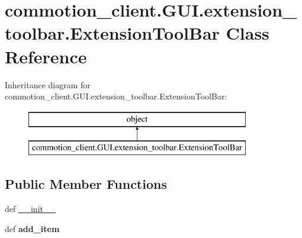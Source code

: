 \hypertarget{classcommotion__client_1_1GUI_1_1extension__toolbar_1_1ExtensionToolBar}{\section{commotion\-\_\-client.\-G\-U\-I.\-extension\-\_\-toolbar.\-Extension\-Tool\-Bar Class Reference}
\label{classcommotion__client_1_1GUI_1_1extension__toolbar_1_1ExtensionToolBar}
}
Inheritance diagram for commotion\-\_\-client.\-G\-U\-I.\-extension\-\_\-toolbar.\-Extension\-Tool\-Bar\-:\begin{figure}[H]
\begin{center}
\leavevmode
\includegraphics[height=2.000000cm]{classcommotion__client_1_1GUI_1_1extension__toolbar_1_1ExtensionToolBar}
\end{center}
\end{figure}
\subsection*{Public Member Functions}
\begin{DoxyCompactItemize}
\item 
def \hyperlink{classcommotion__client_1_1GUI_1_1extension__toolbar_1_1ExtensionToolBar_a29e92f0e66f5f056be55e3a5ef7f2fd8}{\-\_\-\-\_\-init\-\_\-\-\_\-}
\item 
\hypertarget{classcommotion__client_1_1GUI_1_1extension__toolbar_1_1ExtensionToolBar_a82e5c75a5e699eb6dd86810dab2b43a8}{def {\bfseries add\-\_\-item}}\label{classcommotion__client_1_1GUI_1_1extension__toolbar_1_1ExtensionToolBar_a82e5c75a5e699eb6dd86810dab2b43a8}

\end{DoxyCompactItemize}
